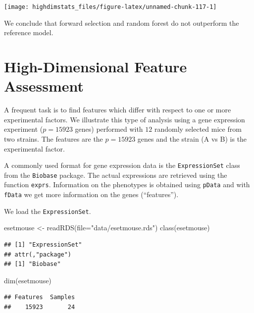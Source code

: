 \documentclass[
]{book}
\newenvironment{Shaded}{\begin{snugshade}}{\end{snugshade}}
\newcommand{\AttributeTok}[1]{\textcolor[rgb]{0.77,0.63,0.00}{#1}}
\newcommand{\FunctionTok}[1]{\textcolor[rgb]{0.00,0.00,0.00}{#1}}
\newcommand{\NormalTok}[1]{#1}
\newcommand{\OtherTok}[1]{\textcolor[rgb]{0.56,0.35,0.01}{#1}}
\newcommand{\StringTok}[1]{\textcolor[rgb]{0.31,0.60,0.02}{#1}}
\begin{document}
\begin{center}\texttt{[image: highdimstats\_files/figure-latex/unnamed-chunk-117-1]} \end{center}

We conclude that forward selection and random forest do not outperform the reference model.

\hypertarget{high-dimensional-feature-assessment}{%
\chapter{High-Dimensional Feature Assessment}\label{high-dimensional-feature-assessment}}

A frequent task is to find features which differ with respect to one or more experimental factors.
We illustrate this type of analysis using a gene expression experiment (\(p=15923\) genes) performed with \(12\) randomly selected mice from two strains. The features are the \(p=15923\) genes and the strain (A vs B) is the experimental factor.

A commonly used format for gene expression data is the \texttt{ExpressionSet} class from the \texttt{Biobase} package. The actual expressions are retrieved using the function \texttt{exprs}. Information on the phenotypes is obtained using \texttt{pData} and with \texttt{fData} we get more information on the genes (``features'').

We load the \texttt{ExpressionSet}.

\begin{Shaded}
\begin{Highlighting}[]
\NormalTok{esetmouse }\OtherTok{\textless{}{-}} \FunctionTok{readRDS}\NormalTok{(}\AttributeTok{file=}\StringTok{"data/esetmouse.rds"}\NormalTok{)}
\FunctionTok{class}\NormalTok{(esetmouse)}
\end{Highlighting}
\end{Shaded}

\begin{verbatim}
## [1] "ExpressionSet"
## attr(,"package")
## [1] "Biobase"
\end{verbatim}

\begin{Shaded}
\begin{Highlighting}[]
\FunctionTok{dim}\NormalTok{(esetmouse)}
\end{Highlighting}
\end{Shaded}

\begin{verbatim}
## Features  Samples 
##    15923       24
\end{verbatim}
\end{document}
